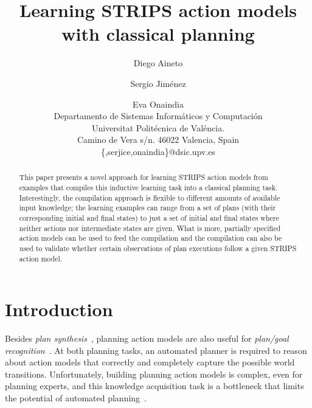 \documentclass[letterpaper]{article} %
\begin{document}
\title{Learning STRIPS action models with classical planning}

\author{Diego Aineto\and Sergio Jim\'enez\and Eva Onaindia\\
{\small Departamento de Sistemas Inform\'aticos y Computaci\'on}\\
{\small Universitat Polit\'ecnica de Val\'encia.}\\
{\small Camino de Vera s/n. 46022 Valencia, Spain}\\
{\small \{,serjice,onaindia\}@dsic.upv.es}}
 
\maketitle
\begin{abstract}
This paper presents a novel approach for learning STRIPS action models from examples that compiles this inductive learning task into a classical planning task. Interestingly, the compilation approach is flexible to different amounts of available input knowledge; the learning examples can range from a set of plans (with their corresponding initial and final states) to just a set of initial and final states where neither actions nor intermediate states are given. What is more, partially specified action models can be used to feed the compilation and the compilation can also be used to validate whether certain observations of plan executions follow a given STRIPS action model.
\end{abstract}


\section{Introduction}
Besides {\em plan synthesis}~\cite{ghallab2004automated,geffner:book:2013}, planning action models are also useful for {\em plan/goal recognition}~\cite{ramirez2012plan}. At both planning tasks, an automated planner is required to reason about action models that correctly and completely capture the possible world transitions. Unfortunately, building planning action models is complex, even for planning experts, and this knowledge acquisition task is a bottleneck that limits the potential of automated planning~\cite{kambhampati:modellite:AAAI2007}.  
\end{document}
